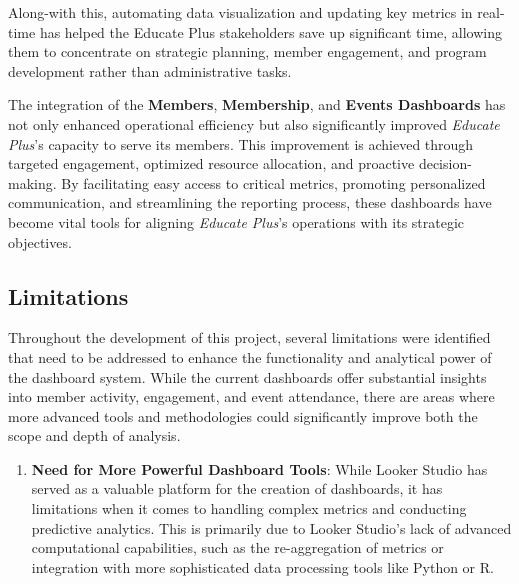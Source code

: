 \documentclass[11pt,a4paper,]{article}
\providecommand{\tightlist}{%
  \setlength{\itemsep}{0pt}\setlength{\parskip}{0pt}}
\begin{document}
\begin{itemize}
  Along-with this, automating data visualization and updating key metrics in real-time has helped the Educate Plus stakeholders save up significant time, allowing them to concentrate on strategic planning, member engagement, and program development rather than administrative tasks.
\end{itemize}

The integration of the \textbf{Members}, \textbf{Membership}, and \textbf{Events Dashboards} has not only enhanced operational efficiency but also significantly improved \emph{Educate Plus}'s capacity to serve its members. This improvement is achieved through targeted engagement, optimized resource allocation, and proactive decision-making. By facilitating easy access to critical metrics, promoting personalized communication, and streamlining the reporting process, these dashboards have become vital tools for aligning \emph{Educate Plus}'s operations with its strategic objectives.

\subsection{Limitations}\label{limitations}

Throughout the development of this project, several limitations were identified that need to be addressed to enhance the functionality and analytical power of the dashboard system. While the current dashboards offer substantial insights into member activity, engagement, and event attendance, there are areas where more advanced tools and methodologies could significantly improve both the scope and depth of analysis.

\begin{enumerate}
\def\labelenumi{\arabic{enumi}.}
\tightlist
\item
  \textbf{Need for More Powerful Dashboard Tools}: While Looker Studio has served as a valuable platform for the creation of dashboards, it has limitations when it comes to handling complex metrics and conducting predictive analytics. This is primarily due to Looker Studio's lack of advanced computational capabilities, such as the re-aggregation of metrics or integration with more sophisticated data processing tools like Python or R.
\end{enumerate}
\end{document}
